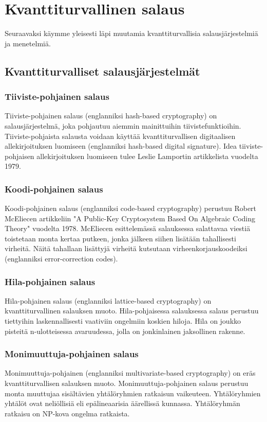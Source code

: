 \chapter{Kvanttiturvallinen salaus\label{results}}
Seuraavaksi käymme yleisesti läpi muutamia kvanttiturvallisia salausjärjestelmiä ja menetelmiä.

\section{Kvanttiturvalliset salausjärjestelmät}

\subsection{Tiiviste-pohjainen salaus}
Tiiviste-pohjainen salaus (englanniksi hash-based cryptography) on salausjärjestelmä, joka pohjautuu aiemmin mainittuihin tiivistefunktioihin. Tiiviste-pohjaista salausta voidaan käyttää kvanttiturvallisen digitaalisen allekirjoituksen luomiseen (englanniksi hash-based digital signature). Idea tiiviste-pohjaisen allekirjoituksen luomiseen tulee Leslie Lamportin artikkelista vuodelta 1979.

\subsection{Koodi-pohjainen salaus}
Koodi-pohjainen salaus (englanniksi code-based cryptography) perustuu Robert McEliecen artikkeliin "A Public-Key Cryptosystem Based On Algebraic Coding Theory" vuodelta 1978. McEliecen esittelemässä salauksessa salattavaa viestiä toistetaan monta kertaa putkeen, jonka jälkeen siihen lisätään tahallisesti virheitä. Näitä tahallaan lisättyjä virheitä kutsutaan virheenkorjauskoodeiksi (englanniksi error-correction codes).

\subsection{Hila-pohjainen salaus}
Hila-pohjainen salaus (englanniksi lattice-based cryptography) on kvanttiturvallinen salauksen muoto. Hila-pohjaisessa salauksessa salaus perustuu tiettyihin laskennallisesti vaativiin ongelmiin koskien hiloja. Hila on joukko pisteitä n-ulotteisessa avaruudessa, jolla on jonkinlainen jaksollinen rakenne.

\subsection{Monimuuttuja-pohjainen salaus}
Monimuuttuja-pohjainen (englanniksi multivariate-based cryptography) on eräs kvanttiturvallisen salauksen muoto. Monimuuttuja-pohjainen salaus perustuu monta muuttujaa sisältävien yhtälöryhmien ratkaisun vaikeuteen. Yhtälöryhmien yhtälöt ovat neliöllisiä eli epälineaarisia äärellissä kunnassa. Yhtälöryhmän ratkaisu on NP-kova ongelma ratkaista. 